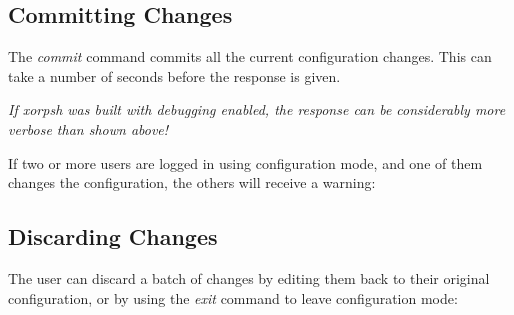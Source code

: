 \newpage
\subsection{Committing Changes}

\noindent{}
\vspace{0.1in}

The \emph{commit} command commits all the current configuration changes.
This can take a number of seconds before the response is given.

{\it If xorpsh was built with debugging enabled, the response can be
considerably more verbose than shown above!}

If two or more users are logged in using configuration mode, and one
of them changes the configuration, the others will receive a warning:
\vspace{0.1in}

\noindent{}
\vspace{0.1in}


\subsection{Discarding Changes}

The user can discard a batch of changes by editing them back to their
original configuration, or by using the \emph{exit} command to leave
configuration mode:
\vspace{0.1in}

